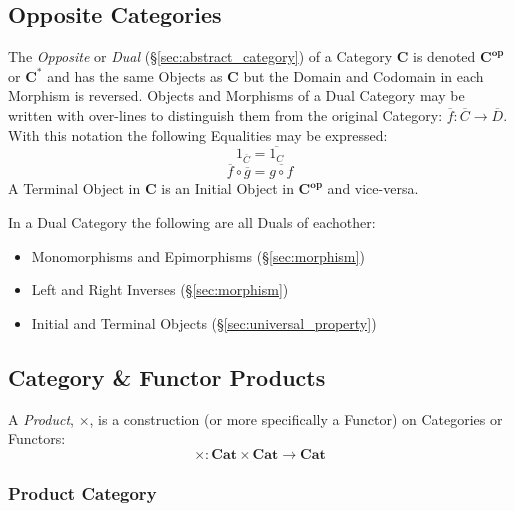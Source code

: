 \subsection{Opposite Categories}\label{sec:opposite_category}

The \emph{Opposite} or \emph{Dual} (\S\ref{sec:abstract_category})
of a Category $\mathbf{C}$ is denoted $\mathbf{C^{op}}$ or
$\mathbf{C^*}$ and has the same Objects as $\mathbf{C}$ but the Domain
and Codomain in each Morphism is reversed. Objects and Morphisms of a
Dual Category may be written with over-lines to distinguish them from
the original Category: $\overline{f}: \overline{C} \rightarrow
\overline{D}$. With this notation the following Equalities may be
expressed:
\[
    1_{\overline{C}} = \overline{1_C}
\]\[
    \overline{f} \circ \overline{g} = \overline{g \circ f}
\]
A Terminal Object in $\mathbf{C}$ is an Initial Object in
$\mathbf{C^{op}}$ and vice-versa.

In a Dual Category the following are all Duals of eachother:
\begin{itemize}
    \item Monomorphisms and Epimorphisms (\S\ref{sec:morphism})
    \item Left and Right Inverses (\S\ref{sec:morphism})
    \item Initial and Terminal Objects (\S\ref{sec:universal_property})
\end{itemize}



\subsection{Category \& Functor Products}\label{sec:category_product}

A \emph{Product}, $\times$, is a construction (or more specifically a
Functor) on Categories or Functors:
\[
    \times : \mathbf{Cat} \times \mathbf{Cat} \rightarrow \mathbf{Cat}
\]



\subsubsection{Product Category}\label{sec:product_category}

